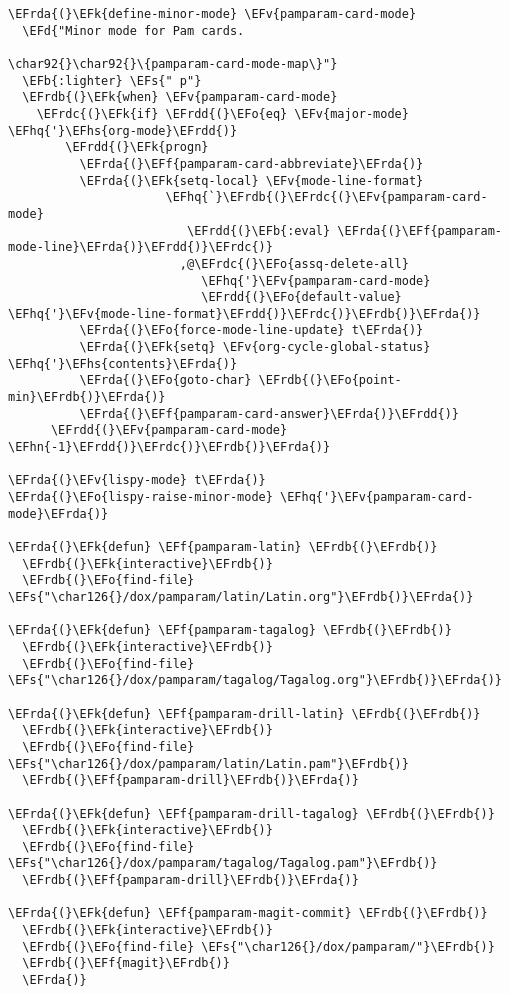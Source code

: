 \documentclass[a4wide,10pt]{article}
\newcommand{\EFs}[1]{\textcolor{EFs}{#1}} %
\newcommand{\EFd}[1]{\textcolor{EFd}{#1}} %
\newcommand{\EFk}[1]{\textcolor{EFk}{#1}} %
\newcommand{\EFb}[1]{\textcolor{EFb}{#1}} %
\newcommand{\EFf}[1]{\textcolor{EFf}{#1}} %
\newcommand{\EFv}[1]{\textcolor{EFv}{#1}} %
\newcommand{\EFo}[1]{\textcolor{EFo}{#1}} %
\newcommand{\EFhn}[1]{\textcolor{EFhn}{\textbf{#1}}} %
\newcommand{\EFhq}[1]{\textcolor{EFhq}{#1}} %
\newcommand{\EFhs}[1]{\textcolor{EFhs}{#1}} %
\newcommand{\EFrda}[1]{\textcolor{EFrda}{#1}} %
\newcommand{\EFrdb}[1]{\textcolor{EFrdb}{#1}} %
\newcommand{\EFrdc}[1]{\textcolor{EFrdc}{#1}} %
\newcommand{\EFrdd}[1]{\textcolor{EFrdd}{#1}} %
\begin{document}
\begin{Code}
\begin{Verbatim}
\EFrda{(}\EFk{define-minor-mode} \EFv{pamparam-card-mode}
  \EFd{"Minor mode for Pam cards.

\char92{}\char92{}\{pamparam-card-mode-map\}"}
  \EFb{:lighter} \EFs{" p"}
  \EFrdb{(}\EFk{when} \EFv{pamparam-card-mode}
    \EFrdc{(}\EFk{if} \EFrdd{(}\EFo{eq} \EFv{major-mode} \EFhq{'}\EFhs{org-mode}\EFrdd{)}
        \EFrdd{(}\EFk{progn}
          \EFrda{(}\EFf{pamparam-card-abbreviate}\EFrda{)}
          \EFrda{(}\EFk{setq-local} \EFv{mode-line-format}
                      \EFhq{`}\EFrdb{(}\EFrdc{(}\EFv{pamparam-card-mode}
                         \EFrdd{(}\EFb{:eval} \EFrda{(}\EFf{pamparam-mode-line}\EFrda{)}\EFrdd{)}\EFrdc{)}
                        ,@\EFrdc{(}\EFo{assq-delete-all}
                           \EFhq{'}\EFv{pamparam-card-mode}
                           \EFrdd{(}\EFo{default-value} \EFhq{'}\EFv{mode-line-format}\EFrdd{)}\EFrdc{)}\EFrdb{)}\EFrda{)}
          \EFrda{(}\EFo{force-mode-line-update} t\EFrda{)}
          \EFrda{(}\EFk{setq} \EFv{org-cycle-global-status} \EFhq{'}\EFhs{contents}\EFrda{)}
          \EFrda{(}\EFo{goto-char} \EFrdb{(}\EFo{point-min}\EFrdb{)}\EFrda{)}
          \EFrda{(}\EFf{pamparam-card-answer}\EFrda{)}\EFrdd{)}
      \EFrdd{(}\EFv{pamparam-card-mode} \EFhn{-1}\EFrdd{)}\EFrdc{)}\EFrdb{)}\EFrda{)}

\EFrda{(}\EFv{lispy-mode} t\EFrda{)}
\EFrda{(}\EFo{lispy-raise-minor-mode} \EFhq{'}\EFv{pamparam-card-mode}\EFrda{)}

\EFrda{(}\EFk{defun} \EFf{pamparam-latin} \EFrdb{(}\EFrdb{)}
  \EFrdb{(}\EFk{interactive}\EFrdb{)}
  \EFrdb{(}\EFo{find-file} \EFs{"\char126{}/dox/pamparam/latin/Latin.org"}\EFrdb{)}\EFrda{)}

\EFrda{(}\EFk{defun} \EFf{pamparam-tagalog} \EFrdb{(}\EFrdb{)}
  \EFrdb{(}\EFk{interactive}\EFrdb{)}
  \EFrdb{(}\EFo{find-file} \EFs{"\char126{}/dox/pamparam/tagalog/Tagalog.org"}\EFrdb{)}\EFrda{)}

\EFrda{(}\EFk{defun} \EFf{pamparam-drill-latin} \EFrdb{(}\EFrdb{)}
  \EFrdb{(}\EFk{interactive}\EFrdb{)}
  \EFrdb{(}\EFo{find-file} \EFs{"\char126{}/dox/pamparam/latin/Latin.pam"}\EFrdb{)}
  \EFrdb{(}\EFf{pamparam-drill}\EFrdb{)}\EFrda{)}

\EFrda{(}\EFk{defun} \EFf{pamparam-drill-tagalog} \EFrdb{(}\EFrdb{)}
  \EFrdb{(}\EFk{interactive}\EFrdb{)}
  \EFrdb{(}\EFo{find-file} \EFs{"\char126{}/dox/pamparam/tagalog/Tagalog.pam"}\EFrdb{)}
  \EFrdb{(}\EFf{pamparam-drill}\EFrdb{)}\EFrda{)}

\EFrda{(}\EFk{defun} \EFf{pamparam-magit-commit} \EFrdb{(}\EFrdb{)}
  \EFrdb{(}\EFk{interactive}\EFrdb{)}
  \EFrdb{(}\EFo{find-file} \EFs{"\char126{}/dox/pamparam/"}\EFrdb{)}
  \EFrdb{(}\EFf{magit}\EFrdb{)}
  \EFrda{)}


\end{Verbatim}
\end{Code}
\end{document}
